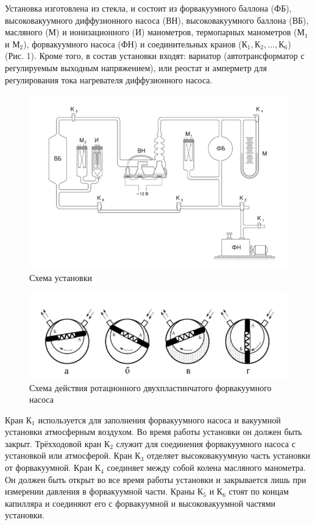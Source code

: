 \documentclass[12pt,a4paper]{article}
\begin{document}
\begin{enumerate}
Установка изготовлена из стекла,
 и состоит из форвакуумного баллона (ФБ), высоковакуумного диффузионного насоса (ВН), высоковакуумного баллона (ВБ), масляного (М) и ионизационного (И) манометров, термопарных манометров ($\text{М}_1$ и $\text{М}_2$), форвакуумного насоса (ФН) и соединительных кранов ($К_1, К_2,..., К_6$) (Рис. 1). Кроме того, в состав установки входят: вариатор (автотрансформатор с регулируемым выходным напряжением), или реостат и амперметр для регулирования тока нагревателя диффузионного насоса. \\
  \begin{figure}[h]
 	\centering
 	\includegraphics[width=0.5 \textheight]{2.3.1_1}
 	\caption{Схема установки}
 	\label{fig:Схема установки}
 \end{figure}

\begin{figure}[t]
	\centering
	\includegraphics[width=0.7\linewidth]{2.3.1_2}
	\caption[]{Схема действия ротационного двухпластинчатого форвакуумного насоса}
	\label{fig:Схема ФВ насоса}
\end{figure}

Кран $К_1$ используется для заполнения форвакуумного насоса и вакуумной установки атмосферным воздухом. Во время работы установки
он должен быть закрыт. Трёхходовой кран $К_2$ служит для соединения
форвакуумного насоса с установкой или атмосферой. Кран $К_3$ отделяет
высоковакуумную часть установки от форвакуумной. Кран $К_4$ соединяет между собой колена масляного манометра. Он должен быть открыт во все время работы установки и закрывается лишь при измерении
давления в форвакуумной части. Краны $К_5$ и $К_6$ стоят по концам капилляра и соединяют его с форвакуумной и высоковакуумной частями установки. 



\end{enumerate}
\end{document}
